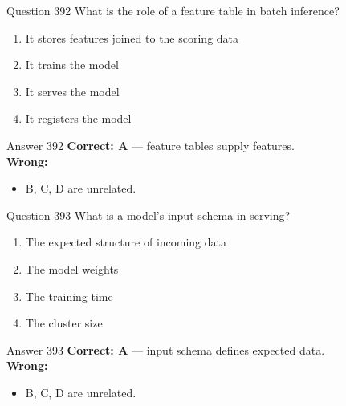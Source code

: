 \documentclass[aspectratio=169,11pt]{beamer}
\begin{document}
	\begin{frame}{Question 392}
		What is the role of a feature table in batch inference?
		\begin{enumerate}[label=\Alph*.]
			\item It stores features joined to the scoring data
			\item It trains the model
			\item It serves the model
			\item It registers the model
		\end{enumerate}
	\end{frame}
	\begin{frame}{Answer 392}
		\textbf{Correct: A} --- feature tables supply features.\\
		\vspace{0.5em}
		\textbf{Wrong:}
		\begin{itemize}
			\item B, C, D are unrelated.
		\end{itemize}
	\end{frame}
	
	\begin{frame}{Question 393}
		What is a model's input schema in serving?
		\begin{enumerate}[label=\Alph*.]
			\item The expected structure of incoming data
			\item The model weights
			\item The training time
			\item The cluster size
		\end{enumerate}
	\end{frame}
	\begin{frame}{Answer 393}
		\textbf{Correct: A} --- input schema defines expected data.\\
		\vspace{0.5em}
		\textbf{Wrong:}
		\begin{itemize}
			\item B, C, D are unrelated.
		\end{itemize}
	\end{frame}
	
\end{document}
